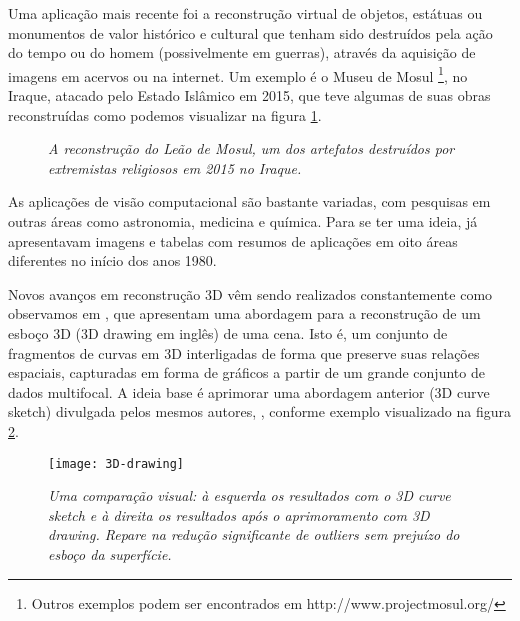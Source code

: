 Uma aplicação mais recente foi a reconstrução virtual de objetos, estátuas ou monumentos de valor histórico e cultural que tenham sido destruídos pela ação do tempo ou do homem (possivelmente em guerras), através da aquisição de imagens em acervos ou na internet. Um exemplo é o Museu de Mosul {\footnote{Outros exemplos podem ser encontrados em http://www.projectmosul.org/}}, no Iraque, atacado pelo 
Estado Islâmico em 2015, que teve algumas de suas obras reconstruídas como podemos visualizar na figura \ref{fig.mossul}.

\begin{figure}[!htb]
\centering
{}
\quad
{}
\caption{{\it A reconstrução do Leão de Mosul, um dos artefatos destruídos por extremistas religiosos em 2015 no Iraque.}}
\label{fig.mossul}
\end{figure}

As aplicações de visão computacional são bastante variadas, com pesquisas em outras áreas como astronomia, medicina e química. Para se ter uma ideia, \citep{ballard-82} já apresentavam imagens e tabelas com resumos de aplicações em oito áreas diferentes no início dos anos 1980.  

Novos avanços em reconstrução 3D vêm sendo realizados constantemente como observamos em \citep{fabbri-drawing}, que apresentam uma abordagem para a reconstrução de um esboço 3D (3D drawing em inglês) de uma cena. Isto é, um conjunto de fragmentos de curvas em 3D interligadas de forma que preserve suas relações espaciais, capturadas em forma de gráficos a partir de um grande conjunto de dados multifocal. A ideia base é aprimorar uma abordagem anterior (3D curve sketch) divulgada pelos mesmos autores, \citep{fabbri-sketch}, conforme exemplo visualizado na figura \ref{fig.drawing}.
\begin{figure}[!htb]
\centering
\texttt{[image: 3D-drawing]}
\caption{{\it Uma comparação visual: à esquerda os resultados com o 3D curve sketch e à direita os resultados após o aprimoramento com 3D drawing. Repare na redução significante de outliers sem prejuízo do esboço da superfície.}}
\label{fig.drawing}
\end{figure}

